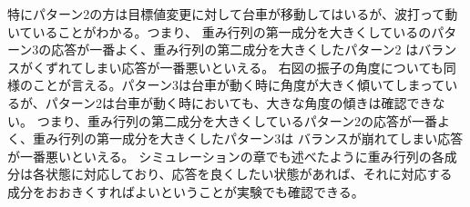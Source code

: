 	特にパターン2の方は目標値変更に対して台車が移動してはいるが、波打って動いていることがわかる。つまり、
	重み行列の第一成分を大きくしているのパターン3の応答が一番よく、重み行列の第二成分を大きくしたパターン2
	はバランスがくずれてしまい応答が一番悪いといえる。
	右図の振子の角度についても同様のことが言える。パターン3は台車が動く時に角度が大きく傾いてしまっているが、パターン2は台車が動く時においても、大きな角度の傾きは確認できない。
	つまり、重み行列の第二成分を大きくしているパターン2の応答が一番よく、重み行列の第一成分を大きくしたパターン3は
	バランスが崩れてしまい応答が一番悪いといえる。
	シミュレーションの章でも述べたように重み行列の各成分は各状態に対応しており、応答を良くしたい状態があれば、それに対応する
	成分をおおきくすればよいということが実験でも確認できる。
	\par
